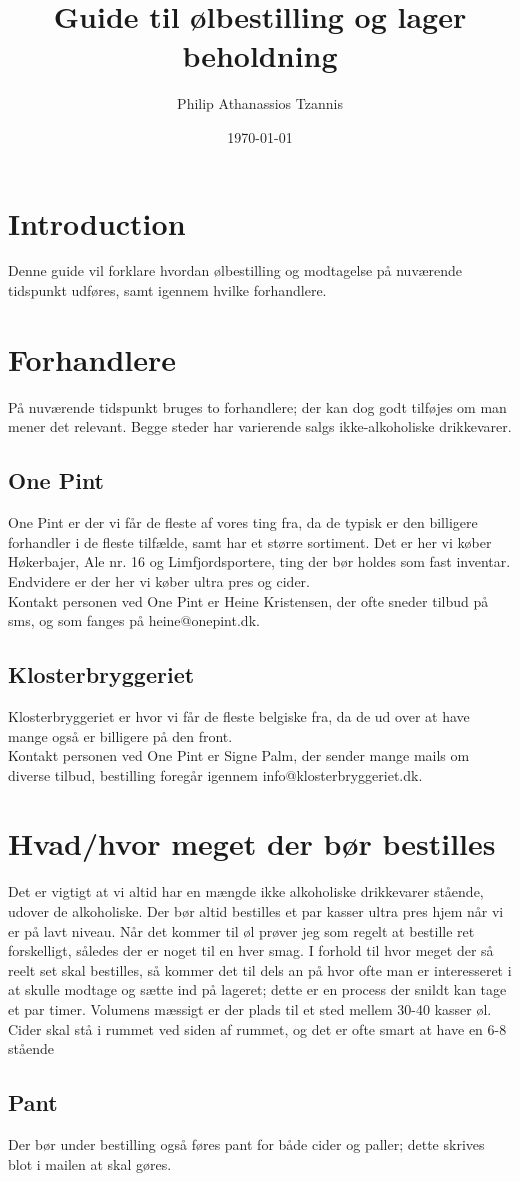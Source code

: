 

\title{Guide til ølbestilling og lager beholdning}
\author{Philip Athanassios Tzannis}
\date{\today}



\maketitle

\section{Introduction}
Denne guide vil forklare hvordan ølbestilling og modtagelse på nuværende tidspunkt udføres, samt igennem hvilke forhandlere.

\section{Forhandlere}
På nuværende tidspunkt bruges to forhandlere; der kan dog godt tilføjes om man mener det relevant. Begge steder har varierende salgs ikke-alkoholiske drikkevarer.
\subsection{One Pint}
One Pint er der vi får de fleste af vores ting fra, da de typisk er den billigere forhandler i de fleste tilfælde, samt har et større sortiment. Det er her vi køber Høkerbajer, Ale nr. 16 og Limfjordsportere, ting der bør holdes som fast inventar. Endvidere er der her vi køber ultra pres og cider.\\
Kontakt personen ved One Pint er Heine Kristensen, der ofte sneder tilbud på sms, og som fanges på heine@onepint.dk.
\subsection{Klosterbryggeriet}
Klosterbryggeriet er hvor vi får de fleste belgiske fra, da de ud over at have mange også er billigere på den front.\\
Kontakt personen ved One Pint er Signe Palm, der sender mange mails om diverse tilbud, bestilling foregår igennem info@klosterbryggeriet.dk.

\section{Hvad/hvor meget der bør bestilles}
Det er vigtigt at vi altid har en mængde ikke alkoholiske drikkevarer stående, udover de alkoholiske. Der bør altid bestilles et par kasser ultra pres hjem når vi er på lavt niveau. Når det kommer til øl prøver jeg som regelt at bestille ret forskelligt, således der er noget til en hver smag. I forhold til hvor meget der så reelt set skal bestilles, så kommer det til dels an på hvor ofte man er interesseret i at skulle modtage og sætte ind på lageret; dette er en process der snildt kan tage et par timer. Volumens mæssigt er der plads til et sted mellem 30-40 kasser øl. Cider skal stå i rummet ved siden af rummet, og det er ofte smart at have en 6-8 stående
\subsection{Pant}
Der bør under bestilling også føres pant for både cider og paller; dette skrives blot i mailen at skal gøres.


